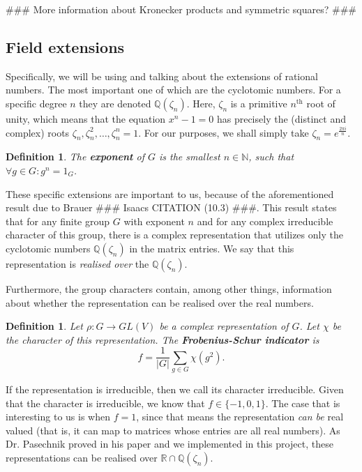 \documentclass[11pt]{article}
\newtheorem{definition}[theorem]{Definition}
\begin{document}
\#\#\# More information about Kronecker products and symmetric squares? \#\#\#

\subsection{Field extensions} \label{sec:extensions}

Specifically, we will be using and talking about the extensions of rational numbers.
The most important one of which are the cyclotomic numbers. For a specific degree $n$ they are denoted $\mathbb{Q}(\zeta_n)$.
Here, $\zeta_n$ is a primitive $n^{\text{th}}$ root of unity, which means that the equation $x^n - 1 = 0$ has
precisely the (distinct and complex) roots $\zeta_n, \zeta_n^2, \ldots, \zeta_n^n = 1$. For our purposes, we
shall simply take $\zeta_n = e^{\frac{2\pi i}{n}}$.
\begin{definition} \label{def:exponent}
  The \textbf{exponent} of $G$ is the smallest $n \in \mathbb{N}$, such that $\forall g \in G: g^n = 1_G$.
\end{definition}

These specific extensions are important to us, because of the aforementioned
result due to Brauer \#\#\# Isaacs CITATION (10.3) \#\#\#.
This result states that for any finite group $G$ with exponent $n$ and for any
complex irreducible character of this group, there is a complex representation
that utilizes only the cyclotomic numbers $\mathbb{Q}(\zeta_n)$ in the matrix
entries. We say that this representation is \textit{realised over} the $\mathbb{Q}(\zeta_n)$.

Furthermore, the group characters contain, among other things, information about whether the representation can
be realised over the real numbers.
\begin{definition} \label{def:fsi}
  Let $\rho: G \rightarrow GL(V)$ be a complex representation of $G$. Let $\chi$ be the character
  of this representation. The \textbf{Frobenius-Schur indicator} is
  \[f = \frac{1}{\lvert G \rvert} \sum_{g \in G}\chi(g^2).\]
\end{definition}
If the representation is irreducible, then we call its character irreducible. Given that
the character is irreducible, we know that $f \in \{-1, 0, 1\}$. The case that is interesting to
us is when $f = 1$, since that means the representation \textit{can be} real valued (that is, it can map to
matrices whose entries are all real numbers). As Dr. Pasechnik proved in his paper \cite{Pas21} and we implemented in
this project, these representations can be realised over $\mathbb{R} \cap \mathbb{Q}(\zeta_n)$.
\end{document}
